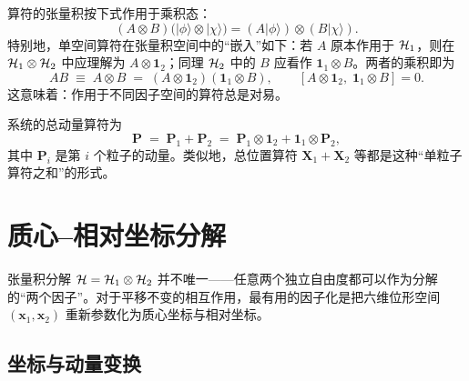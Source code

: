 算符的张量积按下式作用于乘积态：
\begin{equation}
  (A\otimes B)\big(|\phi\rangle\otimes|\chi\rangle\big) = (A|\phi\rangle)\otimes(B|\chi\rangle).
  \label{eq:tensor-operator-action}
\end{equation}
特别地，单空间算符在张量积空间中的“嵌入”如下：若 $A$ 原本作用于 $\mathcal{H}_1$，则在 $\mathcal{H}_1\otimes\mathcal{H}_2$ 中应理解为 $A\otimes \mathbf{1}_2$；同理 $\mathcal{H}_2$ 中的 $B$ 应看作 $\mathbf{1}_1\otimes B$。两者的乘积即为
\begin{equation}
  AB \;\equiv\; A\otimes B \;=\; (A\otimes\mathbf{1}_2)(\mathbf{1}_1\otimes B),
  \qquad [A\otimes\mathbf{1}_2,\;\mathbf{1}_1\otimes B]=0.
  \label{eq:tensor-commute}
\end{equation}
这意味着：作用于不同因子空间的算符总是对易。

\begin{example}
  系统的总动量算符为
  \begin{equation}
    \bm{P} \;=\; \bm{P}_1 + \bm{P}_2 \;=\; \bm{P}_1\otimes\mathbf{1}_2 + \mathbf{1}_1\otimes\bm{P}_2,
    \label{eq:total-momentum}
  \end{equation}
  其中 $\bm{P}_i$ 是第 $i$ 个粒子的动量。类似地，总位置算符 $\bm{X}_1+\bm{X}_2$ 等都是这种“单粒子算符之和”的形式。
\end{example}

\section{质心–相对坐标分解}

张量积分解 $\mathcal{H}=\mathcal{H}_1\otimes\mathcal{H}_2$ 并不唯一——任意两个独立自由度都可以作为分解的“两个因子”。对于平移不变的相互作用，最有用的因子化是把六维位形空间 $(\bm{x}_1,\bm{x}_2)$ 重新参数化为质心坐标与相对坐标。

\subsection{坐标与动量变换}

